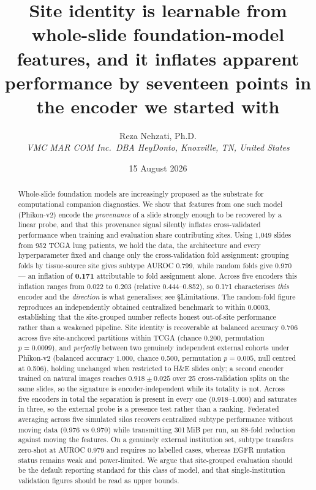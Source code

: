 \documentclass[11pt,a4paper]{article}
\title{\bfseries\color{qnavy} Site identity is learnable from whole-slide foundation-model
features, and it inflates apparent performance by seventeen points in the encoder we started with}
\author{Reza Nehzati, Ph.D.\\[2pt]
{\small\itshape VMC MAR COM Inc.\ DBA HeyDonto, Knoxville, TN, United States}}
\date{15 August 2026}
\begin{document}
\maketitle
\thispagestyle{empty}

\begin{abstract}
\noindent
Whole-slide foundation models are increasingly proposed as the substrate for computational
companion diagnostics. We show that features from one such model (Phikon-v2) encode the
\emph{provenance} of a slide strongly enough to be recovered by a linear probe, and that this
provenance signal silently inflates cross-validated performance when training and evaluation
share contributing sites. Using 1{,}049 slides from 952 TCGA lung patients, we hold the data,
the architecture and every hyperparameter fixed and change only the cross-validation fold
assignment: grouping folds by tissue-source site gives subtype AUROC 0.799, while random folds
give 0.970 --- an inflation of \textbf{0.171} attributable to fold assignment alone.
\textcolor{qred}{Across five encoders this inflation ranges from 0.022 to 0.203 (relative
0.444--0.852), so 0.171 characterises \emph{this} encoder and the \emph{direction} is what
generalises; see \S Limitations.} The
random-fold figure reproduces an independently obtained centralized benchmark to within 0.0003,
establishing that the site-grouped number reflects honest out-of-site performance rather than a
weakened pipeline. Site identity is recoverable at balanced accuracy 0.706 across five
site-anchored partitions within TCGA (chance 0.200, permutation $p = 0.0099$), and
\emph{perfectly} between two genuinely independent external cohorts under Phikon-v2 (balanced
accuracy 1.000, chance 0.500, permutation $p = 0.005$, null centred at 0.506), holding unchanged
when restricted to H\&E slides only; a second encoder trained on natural images reaches $0.918 \pm 0.025$ over 25
cross-validation splits on the same slides, so the signature is encoder-independent while its
totality is not. Across five encoders in total the separation is present in every one
(0.918--1.000) and saturates in three, so the external probe is a presence test rather than a
ranking. Federated averaging across five
simulated silos recovers centralized subtype performance without moving data (0.976 vs 0.970)
while transmitting 301\,MiB per run, an 88-fold reduction against moving the features. On a
genuinely external institution set, subtype transfers zero-shot at AUROC 0.979 and requires no
labelled cases, whereas EGFR mutation status remains weak and power-limited. We argue that
site-grouped evaluation should be the default reporting standard for this class of model, and
that single-institution validation figures should be read as upper bounds.
\end{abstract}
\end{document}

